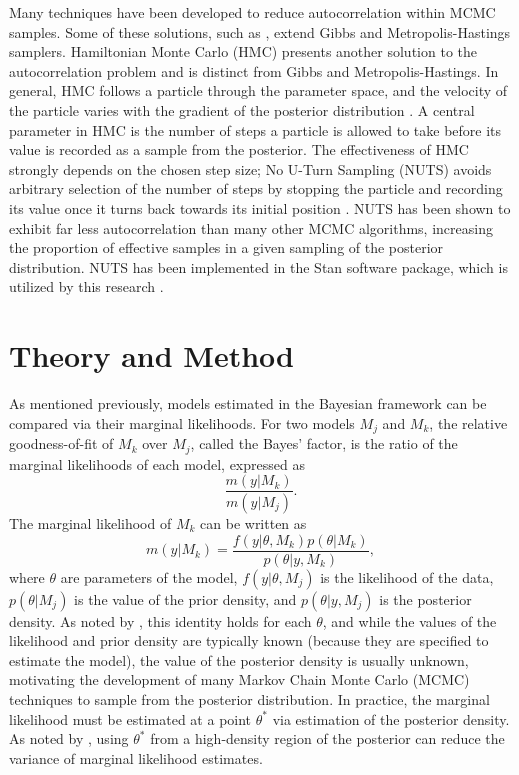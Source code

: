 \documentclass[twocolumn]{article}
\begin{document}
Many techniques have been developed to reduce autocorrelation within MCMC samples. Some of these solutions, such as \cite{Gilks}, extend Gibbs and Metropolis-Hastings samplers. Hamiltonian Monte Carlo (HMC) presents another solution to the autocorrelation problem and is distinct from Gibbs and Metropolis-Hastings. In general, HMC follows a particle through the parameter space, and the velocity of the particle varies with the gradient of the posterior distribution \citep{Girolami}. A central parameter in HMC is the number of steps a particle is allowed to take before its value is recorded as a sample from the posterior. The effectiveness of HMC strongly depends on the chosen step size; No U-Turn Sampling (NUTS) avoids arbitrary selection of the number of steps by stopping the particle and recording its value once it turns back towards its initial position \citep{NUTS}. NUTS has been shown to exhibit far less autocorrelation than many other MCMC algorithms, increasing the proportion of effective samples in a given sampling of the posterior distribution. NUTS has been implemented in the Stan software package, which is utilized by this research \citep{rstan}.

\section{Theory and Method}
\label{sec:Theory}

As mentioned previously, models estimated in the Bayesian framework can be compared via their marginal likelihoods. For two models $M_j$ and $M_k$, the relative goodness-of-fit of $M_k$ over $M_j$, called the Bayes' factor, is the ratio of the marginal likelihoods of each model, expressed as
\begin{equation}
	\frac{m(y|M_k)}{m(y|M_j)}.
\end{equation}
The marginal likelihood of $M_k$ can be written as
\begin{equation}
	m(y|M_k) = \frac{f(y|\theta, M_k)p(\theta|M_k)}{p(\theta|y, M_k)},
\end{equation}
where $\theta$ are parameters of the model, $f(y|\theta, M_j)$ is the likelihood of the data, $p(\theta|M_j)$ is the value of the prior density, and $p(\theta|y, M_j)$ is the posterior density. As noted by \cite{Chib}, this identity holds for each $\theta$, and while the values of the likelihood and prior density are typically known (because they are specified to estimate the model), the value of the posterior density is usually unknown, motivating the development of many Markov Chain Monte Carlo (MCMC) techniques to sample from the posterior distribution. In practice, the marginal likelihood must be estimated at a point $\theta^*$ via estimation of the posterior density. As noted by \cite{Chib}, using $\theta^*$ from a high-density region of the posterior can reduce the variance of marginal likelihood estimates.
\end{document}
